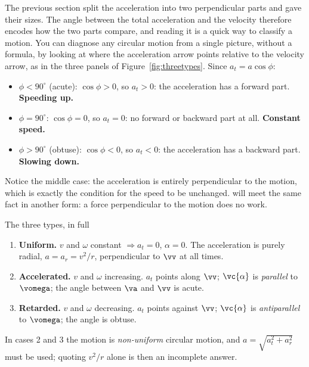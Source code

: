 The previous section split the acceleration into two perpendicular parts and gave their sizes. The
angle between the total acceleration and the velocity therefore encodes how the two parts compare, and
reading it is a quick way to classify a motion. You can diagnose any circular motion from a single picture, without a formula, by looking at where the
acceleration arrow points relative to the velocity arrow, as in the three panels of
Figure~\ref{fig:threetypes}. Since $a_t=a\cos\phi$:
\begin{itemize}
\item $\phi<90^\circ$ (acute): $\cos\phi>0$, so $a_t>0$: the acceleration has a forward part.
      \textbf{Speeding up.}
\item $\phi=90^\circ$: $\cos\phi=0$, so $a_t=0$: no forward or backward part at all.
      \textbf{Constant speed.}
\item $\phi>90^\circ$ (obtuse): $\cos\phi<0$, so $a_t<0$: the acceleration has a backward part.
      \textbf{Slowing down.}
\end{itemize}
Notice the middle case: the acceleration is entirely perpendicular to the motion, which is exactly the
condition for the speed to be unchanged.  will meet the same fact in another form: a
force perpendicular to the motion does no work.


\begin{figure}[htbp]
\centering
{}
\end{figure}

\begin{keybox}{The three types, in full}
\begin{enumerate}
\item \textbf{Uniform.} $v$ and $\omega$ constant $\Rightarrow a_t=0$, $\alpha=0$. The acceleration is
      purely radial, $a=a_r=v^{2}/r$, perpendicular to $\vv$ at all times.
\item \textbf{Accelerated.} $v$ and $\omega$ increasing. $a_t$ points along $\vv$; $\vc{\alpha}$ is
      \emph{parallel} to $\vomega$; the angle between $\va$ and $\vv$ is acute.
\item \textbf{Retarded.} $v$ and $\omega$ decreasing. $a_t$ points against $\vv$; $\vc{\alpha}$ is
      \emph{antiparallel} to $\vomega$; the angle is obtuse.
\end{enumerate}
In cases 2 and 3 the motion is \emph{non-uniform} circular motion, and $a=\sqrt{a_t^{2}+a_r^{2}}$ must
be used; quoting $v^{2}/r$ alone is then an incomplete answer.
\end{keybox}

